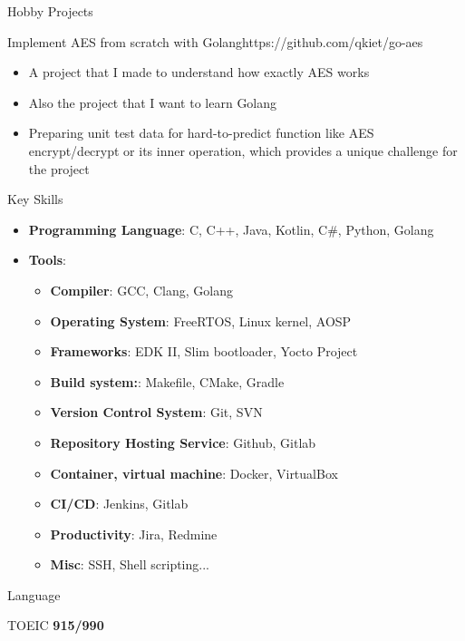 \documentclass{resume} %
\begin{document}
\begin{rSection}{Hobby Projects}
    \begin{rHobbyProjectSubsection}{Implement AES from scratch with Golang}{https://github.com/qkiet/go-aes}{
        \begin{itemize}
            \item A project that I made to understand how exactly AES works
            \item Also the project that I want to learn Golang
        \end{itemize}
    } {
        \begin{itemize}
            \item Preparing unit test data for hard-to-predict function like AES encrypt/decrypt or its inner operation, which provides a unique challenge for the project
        \end{itemize}
    }
    \end{rHobbyProjectSubsection}
\end{rSection}


\begin{rSection}{Key Skills}
\begin{itemize}
    \item \textbf{Programming Language}: C, C++, Java, Kotlin, C\#, Python, Golang
    \item \textbf{Tools}:
    \begin{itemize}
        \item \textbf{Compiler}: GCC, Clang, Golang
        \item \textbf{Operating System}: FreeRTOS, Linux kernel, AOSP
        \item \textbf{Frameworks}: EDK II, Slim bootloader, Yocto Project
        \item \textbf{Build system:}: Makefile, CMake, Gradle
        \item \textbf{Version Control System}: Git, SVN
        \item \textbf{Repository Hosting Service}: Github, Gitlab
        \item \textbf{Container, virtual machine}: Docker, VirtualBox
        \item \textbf{CI/CD}: Jenkins, Gitlab
        \item \textbf{Productivity}: Jira, Redmine
        \item \textbf{Misc}: SSH, Shell scripting...
    \end{itemize}
\end{itemize}

\end{rSection}
\begin{rSection}{Language} \itemsep -3pt
\item TOEIC \textbf{915/990}

\end{rSection}
\end{document}
